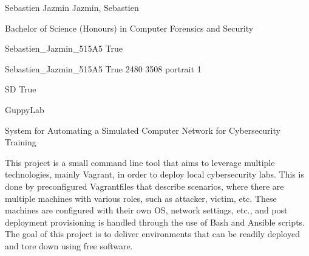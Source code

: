 
\begingroup{}\relax



\def\Key{Sebastien_Jazmin_515A5}

{Sebastien Jazmin}
{Jazmin, Sebastien}

{Bachelor of Science (Honours) in Computer Forensics and Security}

{Sebastien_Jazmin_515A5}
{True}

{Sebastien_Jazmin_515A5}
{True}
{2480}
{3508}
{portrait}
{1}

{SD}
{True}

{GuppyLab}

{System for Automating a Simulated Computer Network for Cybersecurity Training}

{This project is a small command line tool that aims to leverage multiple technologies, mainly Vagrant, in order to deploy local cybersecurity labs. This is done by preconfigured Vagrantfiles that describe scenarios, where there are multiple machines with various roles, such as attacker, victim, etc. These machines are configured with their own OS, network settings, etc., and post deployment provisioning is handled through the use of Bash and Ansible scripts.  The goal of this project is to deliver environments that can be readily deployed and tore down using free software.}

